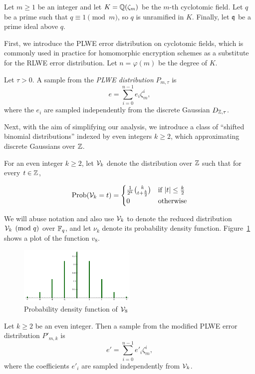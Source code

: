 \documentclass[envcountsect]{llncs}
\begin{document}
Let $m \geq 1$ be an integer and let $K = \mathbb{Q}(\zeta_m)$ be the $m$-th cyclotomic field. Let $q$ be a prime such that
$q \equiv 1\pmod{m}$, so $q$ is unramified in $K$. Finally, let $\mathfrak{q}$ be a prime ideal above $q$. 

First, we introduce the PLWE error distribution on cyclotomic fields, which is commonly used in practice for homomorphic encryption schemes as a substitute for the RLWE error distribution. Let $n = \varphi(m)$ be the degree of $K$.
\begin{definition}
Let $\tau > 0$. A sample from the {\it PLWE distribution} $P_{m,\tau}$ is
\[
    e = \sum_{i=0}^{n-1} e_i \zeta_m^i,
\]
where the $e_i$ are sampled independently from the discrete Gaussian $D_{\mathbb{Z},\tau}$.
\end{definition}

Next, with the aim of simplifying our analysis, we introduce a class of ``shifted binomial distributions'' indexed by even integers $k \geq 2$, which approximating discrete Gaussians over $\mathbb{Z}$.

\begin{definition}
For an even integer $k \geq 2$, let $\mathcal{V}_{k}$ denote the distribution over $\mathbb{Z}$ such that for every $t \in \mathbb{Z}$,

$$\operatorname{Prob}(\mathcal{V}_{k} = t) =  \begin{cases} \frac{1}{2^k}{k \choose t+\frac{k}{2}} &\mbox{if } |t| \leq \frac{k}{2} \\
0 & \mbox{otherwise}  \end{cases}$$

\end{definition}
We will abuse notation and also use $\mathcal{V}_{k}$ to denote the reduced  distribution $\mathcal{V}_{k} \pmod {q}$ over $\mathbb{F}_q$, and let $\nu_{k}$ denote its probability density function. Figure~\ref{fig: v8} shows a plot of the function $v_8$. 

\begin{figure}[h!]
\centering
\includegraphics[width = 0.5\textwidth]{v8.png}
\caption{Probability density function of $\mathcal{V}_{8}$}
\label{fig: v8}
\end{figure}


\begin{definition}
\label{def: modified distribution}
Let $k \geq 2$ be an even integer. Then a sample from the modified PLWE error distribution $P'_{m,k}$ is
\[
    e' = \sum_{i=0}^{n-1} e'_i \zeta_m^{i},
\]
where the coefficients $e'_i$ are sampled independently from $\mathcal{V}_k$.
\end{definition}
\end{document}
